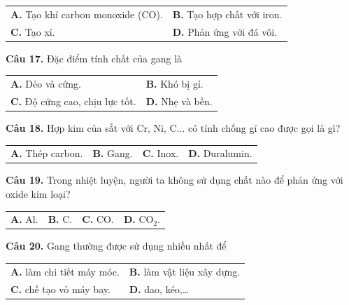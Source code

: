 \documentclass{article}
\begin{document}
\begin{tabularx}{\linewidth}{@{}X X@{}}
\textbf{A.} Tạo khí carbon monoxide (CO). & \textbf{B.} Tạo hợp chất với iron.\\[8pt]
\textbf{C.} Tạo xỉ. & \textbf{D.} Phản ứng với đá vôi.
\end{tabularx}
\vspace*{\fill}
\newpage

\fontsize{28}{36}\selectfont
\textbf{Câu 17.} Đặc điểm tính chất của gang là
\vspace{6pt}

\begin{tabularx}{\linewidth}{@{}X X@{}}
\textbf{A.} Dẻo và cứng. & \textbf{B.} Khó bị gỉ.\\[8pt]
\textbf{C.} Độ cứng cao, chịu lực tốt. & \textbf{D.} Nhẹ và bền.
\end{tabularx}

\vspace*{\fill}

\textbf{Câu 18.} Hợp kim của sắt với $\text{Cr, Ni, C}\dots$ có tính chống gỉ cao được gọi là gì?
\vspace{6pt}

\begin{tabularx}{\linewidth}{@{}X X X X@{}}
\textbf{A.} Thép carbon. & \textbf{B.} Gang. & \textbf{C.} Inox. & \textbf{D.} Duralumin.
\end{tabularx}
\vspace*{\fill}
\newpage

\fontsize{28}{36}\selectfont
\textbf{Câu 19.} Trong nhiệt luyện, người ta không sử dụng chất nào để phản ứng với oxide kim loại?
\vspace{6pt}

\begin{tabularx}{\linewidth}{@{}X X X X@{}}
\textbf{A.} $\text{Al}$. & \textbf{B.} $\text{C}$. & \textbf{C.} $\text{CO}$. & \textbf{D.} $\text{CO}_2$.
\end{tabularx}

\vspace*{\fill}

\textbf{Câu 20.} Gang thường được sử dụng nhiều nhất để
\vspace{6pt}

\begin{tabularx}{\linewidth}{@{}X X@{}}
\textbf{A.} làm chi tiết máy móc. & \textbf{B.} làm vật liệu xây dựng.\\[8pt]
\textbf{C.} chế tạo vỏ máy bay. & \textbf{D.} dao, kéo,\dots
\end{tabularx}
\vspace*{\fill}
\newpage
\end{document}
